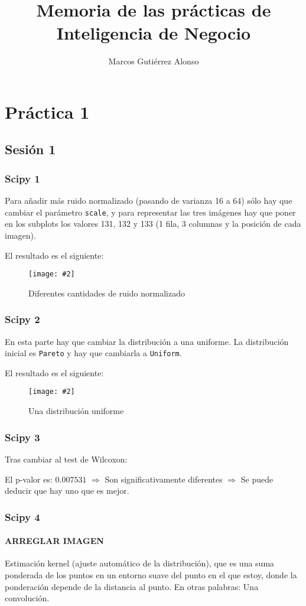 \documentclass[
12pt, 
spanish, 
singlespacing,
headsepline
]{article}
\author{Marcos Gutiérrez Alonso}
\title{Memoria de las prácticas de Inteligencia de Negocio}
\newcommand{\image}[2]{
\begin{figure}[H]
	\caption{#1}
	\centering
	\texttt{[image: \#2]}
\end{figure}
}
\begin{document}
\begin{titlepage}
	\maketitle
	{\hypersetup{linkcolor=black}
	\tableofcontents
	}
\end{titlepage}

\section{Práctica 1}
\subsection{Sesión 1}
\subsubsection{Scipy 1}
Para añadir más ruido normalizado (pasando de varianza 16 a 64) sólo hay que cambiar el parámetro \texttt{scale}, y para representar las tres imágenes hay que poner en los subplots los valores 131, 132 y 133 (1 fila, 3 columnas y la posición de cada imagen).

El resultado es el siguiente:
\image{Diferentes cantidades de ruido normalizado}{pl1/Figure\_1.png}

\subsubsection{Scipy 2}
En esta parte hay que cambiar la distribución a una uniforme.
La distribución inicial es \texttt{Pareto} y hay que cambiarla a \texttt{Uniform}.

El resultado es el siguiente:
\image{Una distribución uniforme}{pl1/Figure_2.png}

\subsubsection{Scipy 3}
Tras cambiar al test de Wilcoxon: 

El p-valor es: $0.007531$ $\Rightarrow$ Son significativamente diferentes $\Rightarrow$ Se puede deducir que hay uno que es mejor.

\subsubsection{Scipy 4}
\paragraph{ARREGLAR IMAGEN}
Estimación kernel (ajuste automático de la distribución), que es una suma ponderada de los puntos en un entorno suave del punto en el que estoy, donde la ponderación depende de la distancia al punto. En otras palabras: Una convolución.
\end{document}
